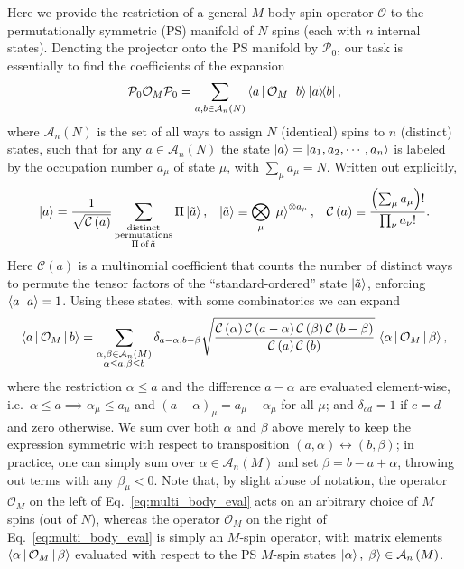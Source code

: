 \documentclass[nofootinbib,twocolumn]{revtex4-2}
\renewcommand{\t}{\text} %
\newcommand{\f}[2]{\dfrac{#1}{#2}} %
\newcommand{\p}[1]{\left(#1\right)} %
\newcommand{\bk}{\Braket} %
\newcommand{\1}{\mathds{1}}
\newcommand{\A}{\mathcal{A}}
\newcommand{\C}{\mathcal{C}}
\renewcommand{\O}{\mathcal{O}}
\renewcommand{\P}{\mathcal{P}}
\begin{document}
Here we provide the restriction of a general $M$-body spin operator $\O$ to the permutationally symmetric (PS) manifold of $N$ spins (each with $n$ internal states).
Denoting the projector onto the PS manifold by $\P_0$, our task is essentially to find the coefficients of the expansion
\begin{align}
  \P_0 \O_M \P_0 = \sum_{a,b\in\A_n\p{N}} \bk{a|\O_M|b} \op{a}{b},
\end{align}
where $\A_n\p{N}$ is the set of all ways to assign $N$ (identical) spins to $n$ (distinct) states, such that for any $a\in\A_n\p{N}$ the state $\ket{a}=\ket{a_1,a_2,\cdots,a_n}$ is labeled by the occupation number $a_\mu$ of state $\mu$, with $\sum_\mu a_\mu=N$.
Written out explicitly,
\begin{align}
  \ket{a} = \f1{\sqrt{\C\p{a}}}
  \sum_{\substack{\t{distinct}\\\t{permutations}\\\Pi\,\t{of}\,\tilde a}}
  \Pi\ket{\tilde a},
  &&
  \ket{\tilde a} \equiv \bigotimes_\mu \ket{\mu}^{\otimes a_\mu},
  &&
  \C\p{a} \equiv \f{\p{\sum_\mu a_\mu}!}{\prod_\nu a_\nu!}.
\end{align}
Here $\C\p{a}$ is a multinomial coefficient that counts the number of distinct ways to permute the tensor factors of the ``standard-ordered'' state $\ket{\tilde a}$, enforcing $\bk{a|a}=1$.
Using these states, with some combinatorics we can expand
\begin{align}
  \bk{a|\O_M|b} =
  \sum_{\substack{\alpha,\beta\in\A_n\p{M}\\\alpha\le a,\beta\le b}}
  \delta_{a-\alpha,b-\beta}
  \sqrt{\f{\C\p{\alpha}\C\p{a-\alpha}\C\p{\beta}\C\p{b-\beta}}
    {\C\p{a}\C\p{b}}}
  \, \bk{\alpha|\O_M|\beta},
  \label{eq:multi_body_eval}
\end{align}
where the restriction $\alpha\le a$ and the difference $a-\alpha$ are evaluated element-wise, i.e.~$\alpha\le a\implies\alpha_\mu\le a_\mu$ and $\p{a-\alpha}_\mu=a_\mu-\alpha_\mu$ for all $\mu$; and $\delta_{cd}=1$ if $c=d$ and zero otherwise.
We sum over both $\alpha$ and $\beta$ above merely to keep the expression symmetric with respect to transposition $\p{a,\alpha}\leftrightarrow\p{b,\beta}$; in practice, one can simply sum over $\alpha\in\A_n\p{M}$ and set $\beta=b-a+\alpha$, throwing out terms with any $\beta_\mu<0$.
Note that, by slight abuse of notation, the operator $\O_M$ on the left of Eq.~\eqref{eq:multi_body_eval} acts on an arbitrary choice of $M$ spins (out of $N$), whereas the operator $\O_M$ on the right of Eq.~\eqref{eq:multi_body_eval} is simply an $M$-spin operator, with matrix elements $\bk{\alpha|\O_M|\beta}$ evaluated with respect to the PS $M$-spin states $\ket\alpha,\ket\beta\in\A_n\p{M}$.
\end{document}
